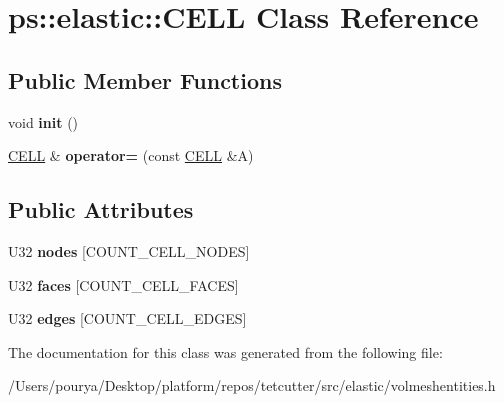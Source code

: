 \hypertarget{classps_1_1elastic_1_1CELL}{}\section{ps\+:\+:elastic\+:\+:C\+E\+L\+L Class Reference}
\label{classps_1_1elastic_1_1CELL}
\subsection*{Public Member Functions}
\begin{DoxyCompactItemize}
\item 
\hypertarget{classps_1_1elastic_1_1CELL_ad8c777847d313a337fae70d551eb6bcb}{}void {\bfseries init} ()\label{classps_1_1elastic_1_1CELL_ad8c777847d313a337fae70d551eb6bcb}

\item 
\hypertarget{classps_1_1elastic_1_1CELL_a368cfd1dbcb72240b61c62e0dba5e715}{}\hyperlink{classps_1_1elastic_1_1CELL}{C\+E\+L\+L} \& {\bfseries operator=} (const \hyperlink{classps_1_1elastic_1_1CELL}{C\+E\+L\+L} \&A)\label{classps_1_1elastic_1_1CELL_a368cfd1dbcb72240b61c62e0dba5e715}

\end{DoxyCompactItemize}
\subsection*{Public Attributes}
\begin{DoxyCompactItemize}
\item 
\hypertarget{classps_1_1elastic_1_1CELL_a895b4ba0a0eddba0b4dedfa5677047f3}{}U32 {\bfseries nodes} \mbox{[}C\+O\+U\+N\+T\+\_\+\+C\+E\+L\+L\+\_\+\+N\+O\+D\+E\+S\mbox{]}\label{classps_1_1elastic_1_1CELL_a895b4ba0a0eddba0b4dedfa5677047f3}

\item 
\hypertarget{classps_1_1elastic_1_1CELL_a367779edf9ba18a162ef9abf70980679}{}U32 {\bfseries faces} \mbox{[}C\+O\+U\+N\+T\+\_\+\+C\+E\+L\+L\+\_\+\+F\+A\+C\+E\+S\mbox{]}\label{classps_1_1elastic_1_1CELL_a367779edf9ba18a162ef9abf70980679}

\item 
\hypertarget{classps_1_1elastic_1_1CELL_a770b037d1e6fa4456bcded2cb40dd64c}{}U32 {\bfseries edges} \mbox{[}C\+O\+U\+N\+T\+\_\+\+C\+E\+L\+L\+\_\+\+E\+D\+G\+E\+S\mbox{]}\label{classps_1_1elastic_1_1CELL_a770b037d1e6fa4456bcded2cb40dd64c}

\end{DoxyCompactItemize}


The documentation for this class was generated from the following file\+:\begin{DoxyCompactItemize}
\item 
/\+Users/pourya/\+Desktop/platform/repos/tetcutter/src/elastic/volmeshentities.\+h\end{DoxyCompactItemize}
